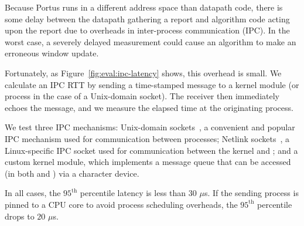 Because Portus runs in a different address space than datapath code, there is some delay between the datapath gathering a report and algorithm code acting upon the report due to overheads in inter-process
communication (IPC).
In the worst case, a severely delayed measurement could cause an algorithm to make an erroneous window update.

Fortunately, as Figure~\ref{fig:eval:ipc-latency} shows, this overhead is small. We calculate an IPC RTT by sending a time-stamped message to a kernel module (or \userspace{} process in the case of a Unix-domain socket). The receiver then immediately echoes the message, and we measure the elapsed time at the originating process.

We test three IPC mechanisms: Unix-domain sockets~\cite{unix-domain}, a convenient and popular IPC mechanism used for communication between \userspace{} processes; Netlink sockets~\cite{netlink}, a Linux-specific IPC socket used for communication between the kernel and \userspace{}; and a custom kernel module, which implements a message queue that can be accessed (in both \userspace{} and ) via a character device.

In all cases, the $95^{\text{th}}$ percentile latency is less than $30$ $\mu$s. If the sending process is pinned to a CPU core to avoid process scheduling overheads, the $95^{\text{th}}$ percentile drops to $20$ $\mu$s.

